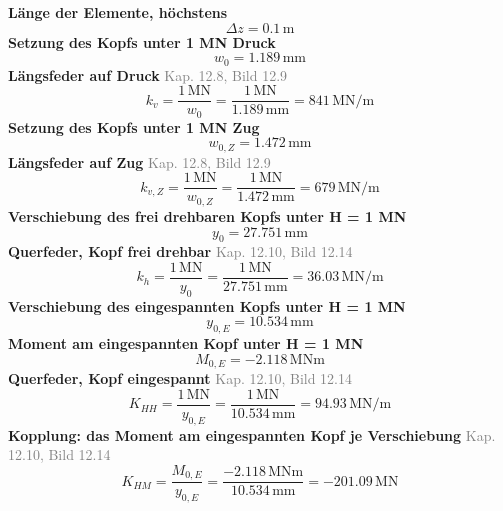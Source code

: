 \documentclass[11pt,a4paper]{article}
\newcommand{\normref}[1]{{\small\textcolor{gray}{#1}}}
\begin{document}
\noindent\textbf{Länge der Elemente, höchstens}
\begin{equation*}
\Delta z = 0.1\,\mathrm{m}
\end{equation*}
\noindent\textbf{Setzung des Kopfs unter 1 MN Druck}
\begin{equation*}
w_0 = 1.189\,\mathrm{mm}
\end{equation*}
\noindent\textbf{Längsfeder auf Druck} \hfill \normref{Kap. 12.8, Bild 12.9}
\begin{equation*}
k_v = \frac{1\,\mathrm{MN}}{w_0} = \frac{1\,\mathrm{MN}}{1.189\,\mathrm{mm}} = 841\,\mathrm{MN}/\mathrm{m}
\end{equation*}
\noindent\textbf{Setzung des Kopfs unter 1 MN Zug}
\begin{equation*}
w_{0,Z} = 1.472\,\mathrm{mm}
\end{equation*}
\noindent\textbf{Längsfeder auf Zug} \hfill \normref{Kap. 12.8, Bild 12.9}
\begin{equation*}
k_{v,Z} = \frac{1\,\mathrm{MN}}{w_{0,Z}} = \frac{1\,\mathrm{MN}}{1.472\,\mathrm{mm}} = 679\,\mathrm{MN}/\mathrm{m}
\end{equation*}
\noindent\textbf{Verschiebung des frei drehbaren Kopfs unter H = 1 MN}
\begin{equation*}
y_0 = 27.751\,\mathrm{mm}
\end{equation*}
\noindent\textbf{Querfeder, Kopf frei drehbar} \hfill \normref{Kap. 12.10, Bild 12.14}
\begin{equation*}
k_h = \frac{1\,\mathrm{MN}}{y_0} = \frac{1\,\mathrm{MN}}{27.751\,\mathrm{mm}} = 36.03\,\mathrm{MN}/\mathrm{m}
\end{equation*}
\noindent\textbf{Verschiebung des eingespannten Kopfs unter H = 1 MN}
\begin{equation*}
y_{0,E} = 10.534\,\mathrm{mm}
\end{equation*}
\noindent\textbf{Moment am eingespannten Kopf unter H = 1 MN}
\begin{equation*}
M_{0,E} = -2.118\,\mathrm{MNm}
\end{equation*}
\noindent\textbf{Querfeder, Kopf eingespannt} \hfill \normref{Kap. 12.10, Bild 12.14}
\begin{equation*}
K_{HH} = \frac{1\,\mathrm{MN}}{y_{0,E}} = \frac{1\,\mathrm{MN}}{10.534\,\mathrm{mm}} = 94.93\,\mathrm{MN}/\mathrm{m}
\end{equation*}
\noindent\textbf{Kopplung: das Moment am eingespannten Kopf je Verschiebung} \hfill \normref{Kap. 12.10, Bild 12.14}
\begin{equation*}
K_{HM} = \frac{M_{0,E}}{y_{0,E}} = \frac{-2.118\,\mathrm{MNm}}{10.534\,\mathrm{mm}} = -201.09\,\mathrm{MN}
\end{equation*}
\end{document}
